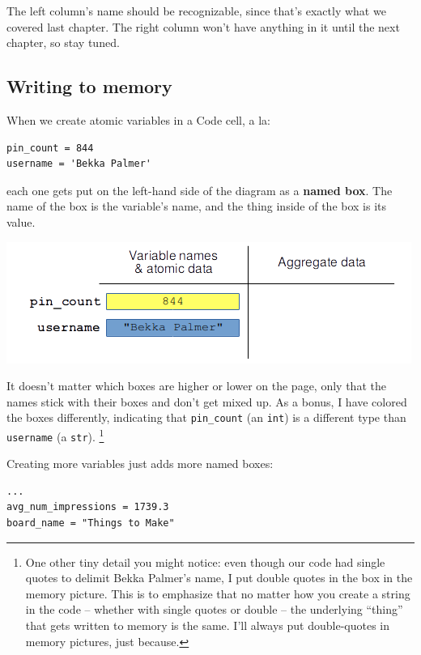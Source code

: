The left column's name should be recognizable, since that's exactly what we
covered last chapter. The right column won't have anything in it until the next
chapter, so stay tuned.

\subsection{Writing to memory}

When we create atomic variables in a Code cell, a la:

\begin{Verbatim}[fontsize=\small,samepage=true,frame=single,framesep=3mm]
pin_count = 844
username = 'Bekka Palmer'
\end{Verbatim}

each one gets put on the left-hand side of the diagram as a \textbf{named box}.
The name of the box is the variable's name, and the thing inside of the box is
its value.

\vspace{-.2in}
\begin{center}
\includegraphics[width=.8\textwidth]{memoryPicture2.png}
\end{center}

It doesn't matter which boxes are higher or lower on the page, only that the
names stick with their boxes and don't get mixed up. As a bonus, I have colored
the boxes differently, indicating that \texttt{pin\_count} (an \texttt{int}) is
a different type than \texttt{username} (a \texttt{str}). \footnote{One other
tiny detail you might notice: even though our code had single quotes to delimit
Bekka Palmer's name, I put double quotes in the box in the memory picture. This
is to emphasize that no matter how you create a string in the code -- whether
with single quotes or double -- the underlying ``thing'' that gets written to
memory is the same. I'll always put double-quotes in memory pictures, just
because.}

Creating more variables just adds more named boxes:

\begin{Verbatim}[fontsize=\small,samepage=true,frame=single,framesep=3mm]
...
avg_num_impressions = 1739.3
board_name = "Things to Make"
\end{Verbatim}

